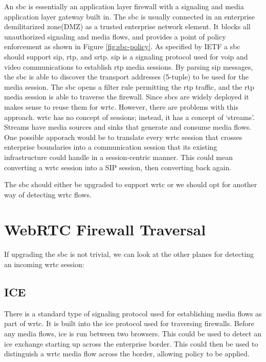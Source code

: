 An \gls{sbc} is essentially an application layer firewall with a signaling and media application layer gateway built in. The \gls{sbc} is usually connected in an enterprise demilitarized zone(DMZ) as a trusted enterprise network element. It blocks all unauthorized signaling and media flows, and provides a point of policy enforcement as shown in Figure \ref{fig:sbc-policy}. As specified by IETF\cite{sbc} a \gls{sbc} should support \gls{sip}, \gls{rtp}, and \gls{srtp}. \gls{sip} is a signaling protocol used for \gls{voip} and video communications to establish \gls{rtp} media sessions. By parsing \gls{sip} messages, the \gls{sbc} is able to discover the transport addresses (5-tuple) to be used for the media session. The \gls{sbc} opens a filter rule permitting the \gls{rtp} traffic, and the \gls{rtp} media session is able to traverse the firewall. Since \gls{sbc}s are widely deployed it makes sense to reuse them for \gls{wrtc}. However, there are problems with this approach. \gls{wrtc} has no concept of sessions; instead, it has a concept of `streams'. Streams have media sources and sinks that generate and consume media flows. One possible apporach would be to translate every \gls{wrtc} session that crosses enterprise boundaries into a communication session that its existing infrastructure could handle in a session-centric manner. This could mean converting a \gls{wrtc} session into a SIP session, then converting back again.

The \gls{sbc} should either be upgraded to support \gls{wrtc} or we should opt for another way of detecting \gls{wrtc} flows.

\section{WebRTC Firewall Traversal}
If upgrading the \gls{sbc} is not trivial, we can look at the other planes for detecting an incoming \gls{wrtc} session:

\subsection{ICE}
There is a standard type of signaling protocol used for establishing media flows as part of \gls{wrtc}. It is built into the \gls{ice} protocol used for traversing firewalls. Before any media flows, \gls{ice} is run between two browsers. This could be used to detect an \gls{ice} exchange starting up across the enterprise border. This could then be used to distinguish a \gls{wrtc} media flow across the border, allowing policy to be applied.

